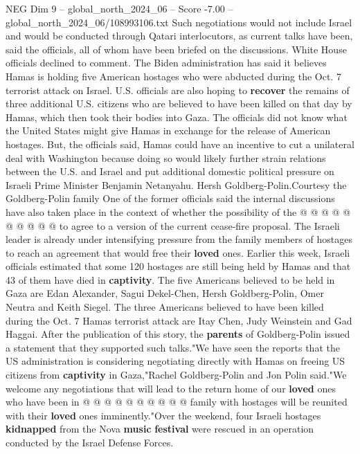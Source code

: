 \begin{textsample}{NEG Dim 9 – global\_north\_2024\_06 – Score -7.00 – global\_north\_2024\_06/108993106.txt}  \label{ex:f9_neg_170}
Such negotiations would not include Israel and would be conducted through Qatari interlocutors, as current talks have been, said the officials, all of whom have been briefed on the discussions.
White House officials declined to comment.
The Biden administration has said it believes Hamas is holding five American hostages who were abducted during the Oct. 7 terrorist attack on Israel.
U.S. officials are also hoping to \textbf{recover} the remains of three additional U.S. citizens who are believed to have been killed on that day by Hamas, which then took their bodies into Gaza.
The officials did not know what the United States might give Hamas in exchange for the release of American hostages.
But, the officials said, Hamas could have an incentive to cut a unilateral deal with Washington because doing so would likely further strain relations between the U.S. and Israel and put additional domestic political pressure on Israeli Prime Minister Benjamin Netanyahu.
Hersh Goldberg-Polin.Courtesy the Goldberg-Polin family One of the former officials said the internal discussions have also taken place in the context of whether the possibility of the @ @ @ @ @ @ @ @ @ @ to agree to a version of the current cease-fire proposal.
The Israeli leader is already under intensifying pressure from the family members of hostages to reach an agreement that would free their \textbf{loved} ones.
Earlier this week, Israeli officials estimated that some 120 hostages are still being held by Hamas and that 43 of them have died in \textbf{captivity}.
The five Americans believed to be held in Gaza are Edan Alexander, Sagui Dekel-Chen, Hersh Goldberg-Polin, Omer Neutra and Keith Siegel.
The three Americans believed to have been killed during the Oct. 7 Hamas terrorist attack are Itay Chen, Judy Weinstein and Gad Haggai.
After the publication of this story, the \textbf{parents} of Goldberg-Polin issued a statement that they supported such talks."We have seen the reports that the US administration is considering negotiating directly with Hamas on freeing US citizens from \textbf{captivity} in Gaza,"Rachel Goldberg-Polin and Jon Polin said."We welcome any negotiations that will lead to the return home of our \textbf{loved} ones who have been in @ @ @ @ @ @ @ @ @ @ family with hostages will be reunited with their \textbf{loved} ones imminently."Over the weekend, four Israeli hostages \textbf{kidnapped} from the Nova \textbf{music} \textbf{festival} were rescued in an operation conducted by the Israel Defense Forces.

\end{textsample}
